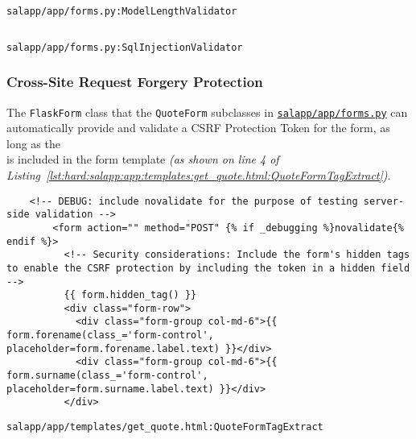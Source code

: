 \begin{listing}[H]
  \captionsetup{skip=\skiplistingcaptionlen}
  \inputminted[breakanywhere,firstline=13,lastline=31]{python3}{../uswacs-2-iy2d502-salapp/app/forms.py}
  \caption{\texttt{salapp/app/forms.py:ModelLengthValidator}}
  \label{lst:hard:salapp:app:forms.py:ModelLengthValidator}
\end{listing}

\begin{listing}[H]
  \captionsetup{skip=\skiplistingcaptionlen}
  \inputminted[breakanywhere,firstline=49,lastline=68]{python3}{../uswacs-2-iy2d502-salapp/app/forms.py}
  \caption{\texttt{salapp/app/forms.py:SqlInjectionValidator}}
  \label{lst:hard:salapp:app:forms.py:SqlInjectionValidator}
\end{listing}

\subsubsection{Cross-Site Request Forgery Protection}
The \texttt{FlaskForm} class that the \texttt{QuoteForm} subclasses in \hyperref[fcl:uswacs-2-iy2d502-salapp:forms.py]{\texttt{salapp/app/forms.py}} can automatically provide and validate a CSRF Protection Token for the form, as long as the\\
 is included in the form template \textit{(as shown on line 4 of Listing~\ref{lst:hard:salapp:app:templates:get_quote.html:QuoteFormTagExtract})}.

\begin{listing}[H]
  \captionsetup{skip=\skiplistingcaptionlen}
  \begin{verbatim}
    <!-- DEBUG: include novalidate for the purpose of testing server-side validation -->
        <form action="" method="POST" {% if _debugging %}novalidate{% endif %}>
          <!-- Security considerations: Include the form's hidden tags to enable the CSRF protection by including the token in a hidden field -->
          {{ form.hidden_tag() }}
          <div class="form-row">
            <div class="form-group col-md-6">{{ form.forename(class_='form-control', placeholder=form.forename.label.text) }}</div>
            <div class="form-group col-md-6">{{ form.surname(class_='form-control', placeholder=form.surname.label.text) }}</div>
          </div>
  \end{verbatim}
  \caption{\texttt{salapp/app/templates/get\_quote.html:QuoteFormTagExtract}}
  \label{lst:hard:salapp:app:templates:get_quote.html:QuoteFormTagExtract}
\end{listing}

